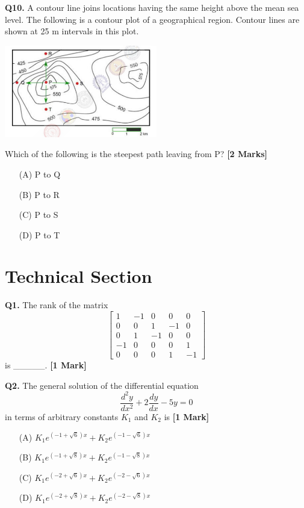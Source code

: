 \documentclass[11pt]{article}
\newcommand{\questiona}[2]{
    \noindent\textbf{Q#2.} #1 \hfill \textbf{[1 Mark]}
}
\newcommand{\questionb}[2]{
    \noindent\textbf{Q#2.} #1 \hfill \textbf{[2 Marks]}
}
\begin{document}
\questionb{A contour line joins locations having the same height above the mean sea level. The following is a contour plot of a geographical region. Contour lines are shown at 25 m intervals in this plot.

\begin{center}
\includegraphics[width=0.5\textwidth]{figures/10.png}
\end{center}

Which of the following is the steepest path leaving from P?}{10}
\begin{enumerate}
    \item[(A)] P to Q
    \item[(B)] P to R
    \item[(C)] P to S
    \item[(D)] P to T
\end{enumerate}

\vspace{0.5cm}

\section*{Technical Section}

\questiona{The rank of the matrix  
\[\begin{bmatrix}
1 & -1 & 0 & 0 & 0 \\
0 & 0 & 1 & -1 & 0 \\
0 & 1 & -1 & 0 & 0 \\
-1 & 0 & 0 & 0 & 1 \\
0 & 0 & 0 & 1 & -1
\end{bmatrix}\]
is \_\_\_\_\_.}{1}

\vspace{0.5cm}

\questiona{The general solution of the differential equation  
\[\frac{d^2 y}{dx^2} + 2 \frac{dy}{dx} - 5y = 0\]
in terms of arbitrary constants \( K_1 \) and \( K_2 \) is}{2}
\begin{enumerate}
    \item[(A)] \( K_1 e^{\left(-1+\sqrt{6}\right)x} + K_2 e^{\left(-1-\sqrt{6}\right)x} \)
    \item[(B)] \( K_1 e^{\left(-1+\sqrt{8}\right)x} + K_2 e^{\left(-1-\sqrt{8}\right)x} \)
    \item[(C)] \( K_1 e^{\left(-2+\sqrt{6}\right)x} + K_2 e^{\left(-2-\sqrt{6}\right)x} \)
    \item[(D)] \( K_1 e^{\left(-2+\sqrt{8}\right)x} + K_2 e^{\left(-2-\sqrt{8}\right)x} \)
\end{enumerate}
\end{document}
